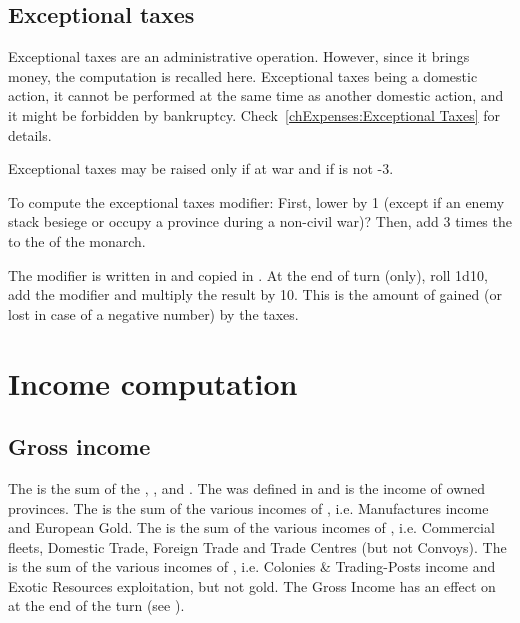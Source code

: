 \subsection{Exceptional taxes}\label{chIncomes:Exceptional Taxes}
\aparag Exceptional taxes are an administrative operation. However,
since it brings money, the computation is recalled here.
\bparag Exceptional taxes being a domestic action, it cannot be
performed at the same time as another domestic action, and it might be
forbidden by bankruptcy.
\bparag Check~\ref{chExpenses:Exceptional Taxes} for details.

\aparag Exceptional taxes may be raised only if at war and if \STAB is
not -3.

\aparag[Summary.] To compute the exceptional taxes modifier:
\bparag First, lower \STAB by 1 (except if an enemy stack besiege or
occupy a province during a non-civil war)?
\bparag Then, add 3 times the \STAB to the \ADM of the monarch.

\aparag The modifier is written in  and copied in .
\bparag At the end of turn (only), roll 1d10, add the modifier and
multiply the result by 10.
\bparag This is the amount of \ducats gained (or lost in case of a
negative number) by the taxes.

\section{Income computation}\label{chIncomes:Summary}
\subsection{Gross income}
\aparag The  is the sum of the ,
,  and .
\bparag The  was defined in
 and is the income of owned provinces.
\bparag The  is the sum of the various incomes
of , i.e. Manufactures income and European
Gold.
\bparag The  is the sum of the various incomes of
, i.e. Commercial fleets, Domestic Trade,
Foreign Trade and Trade Centres (but not Convoys).
\bparag The  is the sum of the various incomes of
, i.e. Colonies \& Trading-Posts income and
Exotic Resources exploitation, but not \ROTW gold.
\bparag[Stability] The Gross Income has an effect on \STAB at the end of
the turn (see ).

